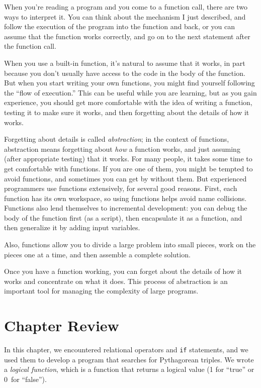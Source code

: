When you're reading a program and you come to a function call,
there are two ways to interpret it. You can think about the mechanism I just described,
and follow the execution of the program into the function and back, or you can assume that the function works correctly, and go on to the next statement after the function call.

When you use a built-in function, it's natural to assume that it works, in part because you don't
usually have access to the code in the body of the function.
But when you start writing your own functions, you might
find yourself following the ``flow of execution.''  This can
be useful while you are learning, but as you gain experience, you
should get more comfortable with the idea of writing a function,
testing it to make sure it works, and then forgetting about the
details of how it works.


Forgetting about details is called \emph{abstraction}; in the context
of functions, abstraction means forgetting about \emph{how} a function
works, and just assuming (after appropriate testing) that it works.
For many people, it takes some time to get comfortable with functions.  If you are one of them, you might be tempted to avoid functions, and sometimes you can get by without them.
But experienced programmers use functions extensively, for several good reasons. First, each function has its own workspace, so using functions helps
avoid name collisions. 
Functions also lend themselves to incremental development: you can
debug the body of the function first (as a script), then encapsulate
it as a function, and then generalize it by adding input variables.

Also, functions allow you to divide a large problem into small
pieces, work on the pieces one at a time, and then assemble a
complete solution. 

Once you have a function working, you can forget about the
details of how it works and concentrate on what it does.  This
process of abstraction is an important tool for managing the
complexity of large programs.


\section{Chapter Review}

In this chapter, we encountered relational operators and \lstinline{if} statements, and we used them to develop a program that searches for Pythagorean triples.
We wrote a \emph{logical function}, which is a function that returns a logical value
(1 for ``true'' or 0~for ``false'').

